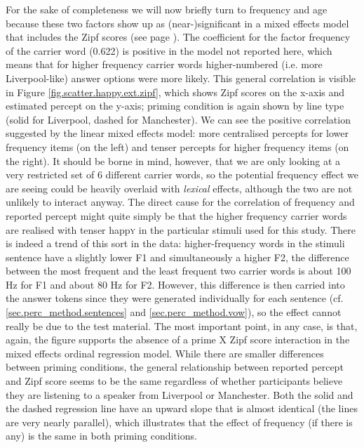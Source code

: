 For the sake of completeness we will now briefly turn to frequency and age because these two factors show up as (near-)significant in a mixed effects model that includes the Zipf scores (see page \pageref{sec.perc_res.happy}).
The coefficient for the factor frequency of the carrier word (0.622) is positive in the model not reported here, which means that for higher frequency carrier words higher-numbered (i.e. more Liverpool-like) answer options were more likely.
This general correlation is visible in Figure \ref{fig.scatter.happy.ext.zipf}, which shows Zipf scores on the x-axis and estimated percept on the y-axis; priming condition is again shown by line type (solid for Liverpool, dashed for Manchester).
We can see the positive correlation suggested by the linear mixed effects model: more centralised percepts for lower frequency items (on the left) and tenser percepts for higher frequency items (on the right).
It should be borne in mind, however, that we are only looking at a very restricted set of 6 different carrier words, so the potential frequency effect we are seeing could be heavily overlaid with \emph{lexical} effects, although the two are not unlikely to interact anyway.
The direct cause for the correlation of frequency and reported percept might quite simply be that the higher frequency carrier words are realised with tenser happ\textsc{y} in the particular stimuli used for this study.
There is indeed a trend of this sort in the data: higher-frequency words in the stimuli sentence have a slightly lower F1 and simultaneously a higher F2, the difference between the most frequent and the least frequent two carrier words is about 100 Hz for F1 and about 80 Hz for F2.
However, this difference is then carried into the answer tokens since they were generated individually for each sentence (cf. \ref{sec.perc_method.sentences} and \ref{sec.perc_method.vow}), so the effect cannot really be due to the test material.
The most important point, in any case, is that, again, the figure supports the absence of a prime X Zipf score interaction in the mixed effects ordinal regression model.
While there are smaller differences between priming conditions, the general relationship between reported percept and Zipf score seems to be the same regardless of whether participants believe they are listening to a speaker from Liverpool or Manchester.
Both the solid and the dashed regression line have an upward slope that is almost identical (the lines are very nearly parallel), which illustrates that the effect of frequency (if there is any) is the same in both priming conditions.

